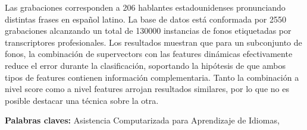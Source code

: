 Las grabaciones corresponden a 206 hablantes estadounidenses pronunciando distintas
frases en español latino. La base de datos está conformada por 2550 grabaciones alcanzando
un total de 130000 instancias de fonos etiquetadas
por transcriptores profesionales.
Los resultados muestran que para un subconjunto de fonos, la combinación de supervectors
con las features dinámicas efectivamente reduce el error durante la clasificación,
soportando la
hipótesis de que ambos tipos de features contienen información complementaria.
Tanto la combinación a nivel score como a nivel features arrojan resultados similares, por
lo que no es posible destacar una técnica sobre la otra.

\bigskip

\noindent\textbf{Palabras claves:} Asistencia Computarizada para Aprendizaje de Idiomas,
